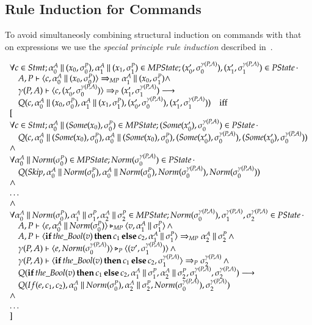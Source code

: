 \documentclass[a4paper,10pt]{article}
\begin{document}
\subsection*{Rule Induction for Commands}
To avoid simultaneosly combining structural induction on commands with that on expressions we use the
\emph{special principle rule induction} described in~\cite[p44]{Winskel}.

\begin{displaymath}
\begin{array}{l}
\forall c \in Stmt; \siA \monitor (x_0, \siP), \soA \monitor (x_1, \soP) \in MPState; (x'_0, \siAP),
(x'_1, \soAP) \in PState\, \cdot\\
\quad \stmp{c, \siA \monitor (x_0, \siP)}{\soA \monitor (x_0, \soP)} \wedge\\
\quad \stap{c, (x'_0, \siAP)}{(x'_1, \soAP)} \longrightarrow\\
\quad Q(c, \siA \monitor (x_0, \siP), \soA \monitor (x_1, \soP), (x'_0, \siAP), (x'_1, \soAP)) \quad
\text{iff}\\
\lbrack\\ %
\forall c \in Stmt; \siA \monitor (Some(x_0), \siP) \in MPState; (Some(x'_0), \siAP) \in PState\, \cdot\\
\quad Q(c, \siA \monitor (Some(x_0), \siP), \siA \monitor (Some(x_0), \siP), (Some(x'_0), \siAP), (Some(x'_0),
\siAP))\\
\wedge\\ %
\forall \siA \monitor Norm(\siP) \in MPState; Norm(\siAP) \in PState\, \cdot\\
\quad Q(Skip, \siA \monitor Norm(\siP), \siA \monitor Norm(\siP), Norm(\siAP), Norm(\siAP))\\
\wedge\\
\ldots\\
\wedge\\
\forall \sinMP, \soA \monitor \soP, \stA \monitor \stP \in MPState; Norm(\siAP), \soAP, \stAP \in PState\,
\cdot\\
\quad \etmp{e, \sinMP}{v, \soMP} \,\wedge\\
\quad \stmp{\pif{the\_Bool(v)}{c_1}{c_2}, \soMP}{\stMP} \,\wedge\\
\quad \etap{e, \sinAP}{(v', \soAP)} \,\wedge\\
\quad \stap{\pif{the\_Bool(v)}{c_1}{c_2}, \soAP}{\stAP} \,\wedge\\
\quad Q(\pif{the\_Bool(v)}{c_1}{c_2}, \soMP, \stMP, \soAP, \stAP) \longrightarrow\\
\quad Q(If(e, c_1, c_2), \sinMP, \stMP, \sinAP, \stAP)\\
\wedge\\
\ldots\\
\rbrack
\end{array}
\end{displaymath}
\end{document}
